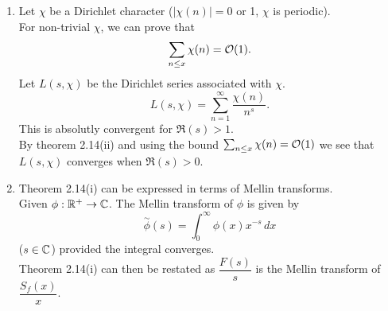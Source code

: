 \documentclass[twoside, openright, fontsize=10pt, headings=big]{scrbook}
\begin{document}
\begin{remark}
    \begin{enumerate}
        \item Let $\chi$ be a Dirichlet character ($|\chi(n)|=0$ or 1, $\chi$ is periodic).\\
        For non-trivial $\chi$, we can prove that
        \[
            \sum_{n\leq x}\chi(n)=\mathcal{O}(1).
        \]
        Let $L(s,\chi)$ be the Dirichlet series associated with $\chi$.
        \[
            L(s,\chi)=\sum_{n=1}^{\infty}\frac{\chi(n)}{n^s}.
        \]
        This is absolutly convergent for $\Re(s)>1$.\\
        By theorem 2.14(ii) and using the bound $\sum_{n\leq x}\chi(n)=\mathcal{O}(1)$ we see that $L(s,\chi)$ converges when $\Re(s)>0$.
        \item Theorem 2.14(i) can be expressed in terms of Mellin transforms.\\
        Given $\phi:\mathbb{R}^+\to\mathbb{C}$. The Mellin transform of $\phi$ is given by
        \[
            \overset{\sim}{\phi}(s)=\int_{0}^{\infty}\phi(x)x^{-s}\,dx
        \]
        ($s\in\mathbb{C}$) provided the integral converges.\\
        Theorem 2.14(i) can then be restated as $\dfrac{F(s)}{s}$ is the Mellin transform of $\dfrac{S_f(x)}{x}$.
    \end{enumerate}
\end{remark}
\end{document}
